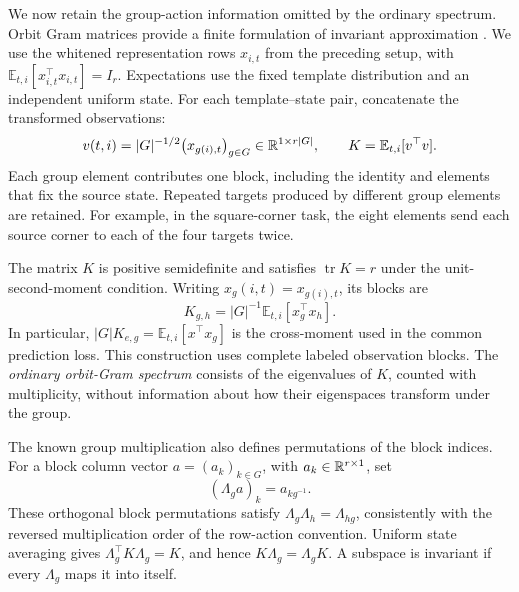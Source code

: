 We now retain the group-action information omitted by the
ordinary spectrum.
Orbit Gram matrices provide a finite formulation of
invariant approximation \citep{barbieri2020approximation}.
We use the whitened representation rows $x_{i,t}$ from
the preceding setup, with
$\mathbb E_{t,i}[x_{i,t}^{\top}x_{i,t}]=I_r$.
Expectations use the fixed template distribution and an
independent uniform state.
For each template--state pair, concatenate the transformed
observations:
\begin{equation}
 v(t,i)
 =
 |G|^{-1/2}\bigl(x_{g(i),t}\bigr)_{g\in G}
 \in\mathbb{R}^{1\times r|G|},
 \qquad
 K=\mathbb E_{t,i}[v^\top v].
 \label{eq:orbit-gram-main}
\end{equation}
Each group element contributes one block, including the
identity and elements that fix the source state.
Repeated targets produced by different group elements
are retained.
For example, in the square-corner task, the eight elements
send each source corner to each of the four targets twice.

The matrix $K$ is positive semidefinite and satisfies
$\operatorname{tr}K=r$ under the unit-second-moment
condition.
Writing $x_g(i,t)=x_{g(i),t}$, its blocks are
\[
 K_{g,h}
 =
 |G|^{-1}\mathbb E_{t,i}[x_g^\top x_h].
\]
In particular,
$|G|K_{e,g}=\mathbb E_{t,i}[x^\top x_g]$
is the cross-moment used in the common prediction loss.
This construction uses complete labeled observation
blocks.
The \emph{ordinary orbit-Gram spectrum} consists of the
eigenvalues of $K$, counted with multiplicity, without
information about how their eigenspaces transform under
the group.

The known group multiplication also defines permutations
of the block indices.
For a block column vector
$a=(a_k)_{k\in G}$, with $a_k\in\mathbb{R}^{r\times1}$, set
\[
 (\Lambda_g a)_k=a_{kg^{-1}}.
\]
These orthogonal block permutations satisfy
$\Lambda_g\Lambda_h=\Lambda_{hg}$, consistently with the
reversed multiplication order of the row-action convention.
Uniform state averaging gives
$\Lambda_g^\top K\Lambda_g=K$, and hence
$K\Lambda_g=\Lambda_gK$.
A subspace is invariant if every $\Lambda_g$ maps it
into itself.

